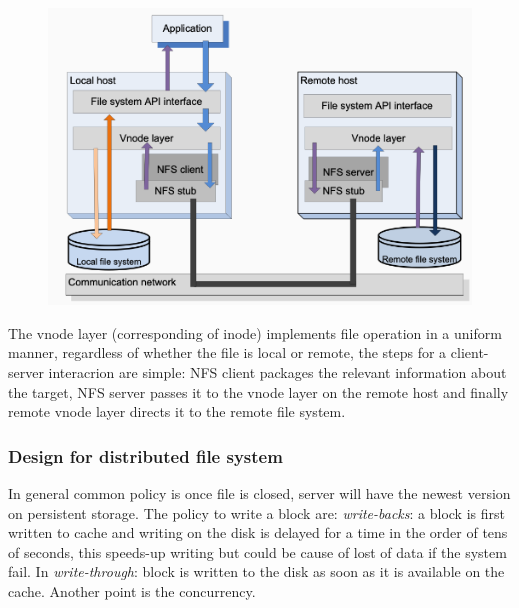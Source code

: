 \begin{figure}[h!]
    \centering
    \includegraphics[scale=0.35]{images/NFS.png}
\end{figure}

The vnode layer (corresponding of inode) implements file operation in a uniform manner, regardless of whether the file is local or remote, the steps for a client-server interacrion are simple: NFS client packages the relevant information about the target, NFS server passes it to the vnode layer on the remote host and finally remote vnode layer directs it to the remote file system.

\subsubsection{Design for distributed file system}
In general  common policy is once file is closed, server will have the newest version on persistent storage. The policy to write a block are: \textit{write-backs}: a block is first written to cache and writing on the disk is delayed for a time in the order of tens of seconds, this speeds-up writing but could be cause of lost of data if the system fail. In \textit{write-through}: block is written to the disk as soon as it is available on the cache. Another point is the concurrency.

